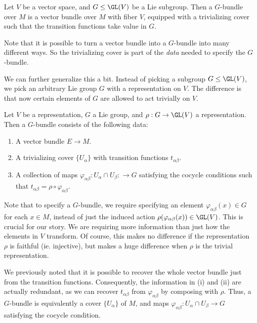 \documentclass[a4paper]{article}
\begin{document}
\begin{defi}[$G$-bundle]
  Let $V$ be a vector space, and $G \leq \GL(V)$ be a Lie subgroup. Then a $G$-bundle over $M$ is a vector bundle over $M$ with fiber $V$, equipped with a trivializing cover such that the transition functions take value in $G$.
\end{defi}
Note that it is possible to turn a vector bundle into a $G$-bundle into many different ways. So the trivializing cover is part of the \emph{data} needed to specify the $G$-bundle.

We can further generalize this a bit. Instead of picking a subgroup $G \leq \GL(V)$, we pick an arbitrary Lie group $G$ with a representation on $V$. The difference is that now certain elements of $G$ are allowed to act trivially on $V$.

\begin{defi}[$G$-bundle]
  Let $V$ be a representation, $G$ a Lie group, and $\rho: G \to \GL(V)$ a representation. Then a $G$-bundle consists of the following data:
  \begin{enumerate}
    \item A vector bundle $E \to M$.
    \item A trivializing cover $\{U_\alpha\}$ with transition functions $t_{\alpha\beta}$.
    \item A collection of maps $\varphi_{\alpha\beta}: U_{\alpha} \cap U_\beta: \to G$ satisfying the cocycle conditions such that $t_{\alpha\beta} = \rho \circ \varphi_{\alpha\beta}$.
  \end{enumerate}
\end{defi}
Note that to specify a $G$-bundle, we require specifying an element $\varphi_{\alpha\beta}(x) \in G$ for each $x \in M$, instead of just the induced action $\rho(\varphi_{\alpha\beta}(x)) \in \GL(V)$. This is crucial for our story. We are requiring more information than just how the elements in $V$ transform. Of course, this makes no difference if the representation $\rho$ is faithful (ie. injective), but makes a huge difference when $\rho$ is the trivial representation.

We previously noted that it is possible to recover the whole vector bundle just from the transition functions. Consequently, the information in (i) and (ii) are actually redundant, as we can recover $t_{\alpha\beta}$ from $\varphi_{\alpha\beta}$ by composing with $\rho$. Thus, a $G$-bundle is equivalently a cover $\{U_\alpha\}$ of $M$, and maps $\varphi_{\alpha\beta}: U_\alpha \cap U_\beta \to G$ satisfying the cocycle condition.
\end{document}

